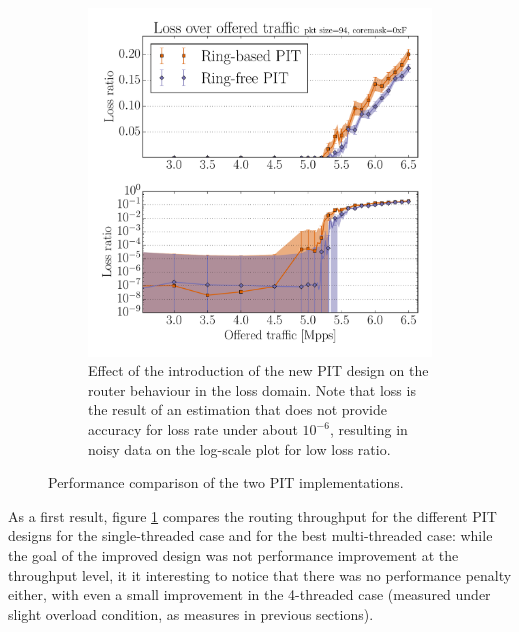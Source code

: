 \documentclass[11pt,a4paper,twoside,titlepage,openany]{book}
\begin{document}
\begin{figure}[tb]
\begin{subfigure}[t]{.35\textwidth}
    \label{fig:test.pit.thr}
  \end{subfigure}
  \unskip ~~
  \begin{subfigure}[t]{.6\textwidth}
    \centering
    \includegraphics[width=\textwidth]{img/augustus_load_loss.pdf}
    \caption[Effect of the introduction of the new PIT design on the router behaviour in the loss domain]{Effect of the introduction of the new PIT design on the router behaviour in the loss domain. Note that loss is the result of an estimation that does not provide accuracy for loss rate under about $10^{-6}$, resulting in noisy data on the log-scale plot for low loss ratio.}
    \label{fig:test.pit.load_loss}
  \end{subfigure}
  \caption[Comparison of the PIT implementations]{Performance comparison of the two PIT implementations.}
\end{figure}

As a first result, figure \ref{fig:test.pit.thr} compares the routing throughput for the different PIT designs for the single-threaded case and for the best multi-threaded case: while the goal of the improved design was not performance improvement at the throughput level, it it interesting to notice that there was no performance penalty either, with even a small improvement in the 4-threaded case (measured under slight overload condition, as measures in previous sections).
\end{document}
